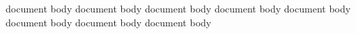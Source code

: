 \documentclass{article}
\begin{document}
document body document body document body document body
document body document body document body document body
\end{document}

